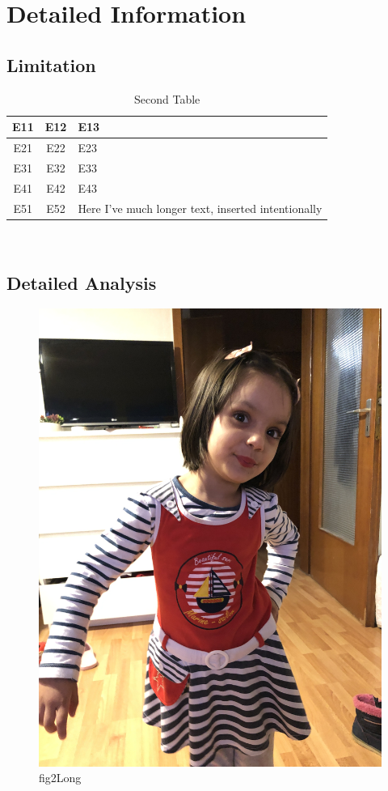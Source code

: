 \chapter{Detailed Information}

\lipsum[1-3]
\section{Limitation}
\lipsum[1]
\bigskip
\lipsum[1]



	\begin{table}[h]
	\caption{Second Table}
	\centering
	\begin{tabular}{| c | c | p{4cm} | }
		E11 & E12 & E13 \\ \hline  %
		E21 & E22 & E23 \\
		E31 & E32 & E33 \\
		E41 & E42 & E43 \\
		E51 & E52 & Here I've much longer text, inserted intentionally
	\end{tabular} \\
\end{table}

\section{Detailed Analysis}

\lipsum[1]

\begin{figure}[t]
	\centering
	\includegraphics[width=0.7\linewidth]{chapters/chapter2/FigureCh2/IMG}
	\caption[fig2short]{fig2Long}
	\label{fig:img2}
\end{figure}



